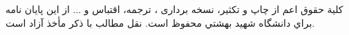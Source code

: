 \ \\ \\ \\ \\ \\ \\ \\ \\ \\
{\dav
\begin{center}
كلية حقوق اعم از چاپ و تكثير، نسخه برداری ، ترجمه، اقتباس و ... از اين پايان نامه براي دانشگاه شهيد بهشتي محفوظ است.
 نقل  مطالب با ذكر مأخذ آزاد است.
\end{center}
}
